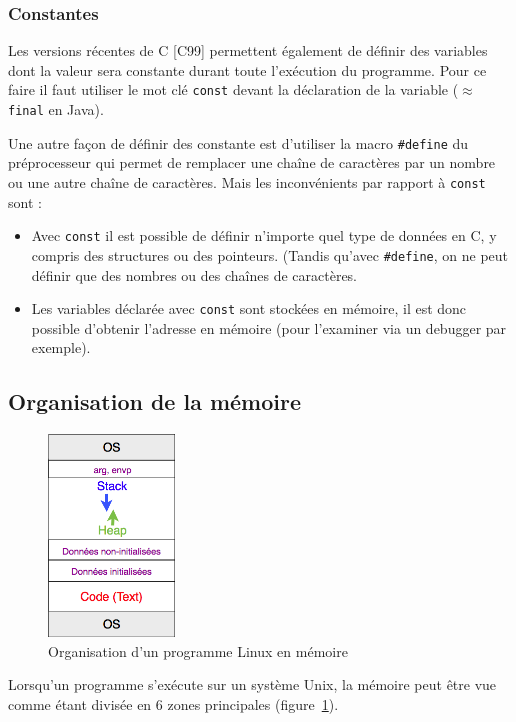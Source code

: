 \subsubsection{Constantes}
Les versions récentes de C [C99] permettent également de définir des variables dont la valeur sera constante durant toute l'exécution du programme.
Pour ce faire il faut utiliser le mot clé \texttt{const} devant la déclaration de la variable ($\approx$ \texttt{final} en Java).

Une autre façon de définir des constante est d'utiliser la macro \texttt{\#define} du préprocesseur qui permet de remplacer une chaîne de caractères par un nombre ou une autre chaîne de caractères.
Mais les inconvénients par rapport à \texttt{const} sont :
\begin{itemize}
  \item Avec \texttt{const} il est possible de définir n'importe quel type de données en C, y compris des structures ou des pointeurs.
    (Tandis qu'avec \texttt{\#define}, on ne peut définir que des nombres ou des chaînes de caractères.
  \item Les variables déclarée avec \texttt{const} sont stockées en mémoire, il est donc possible d'obtenir l'adresse en mémoire (pour l'examiner via un debugger par exemple).
\end{itemize}


\subsection{Organisation de la mémoire}
\begin{figure}
  \vspace{-0.5cm}
  \includegraphics[width=0.3\textwidth]{mem}
  \caption{\label{fig:mem} Organisation d'un programme Linux en mémoire}
  \vspace{-2.5cm}
\end{figure}
Lorsqu'un programme s'exécute sur un système Unix, la mémoire peut être vue comme étant divisée en 6 zones principales (figure~\ref{fig:mem}).
